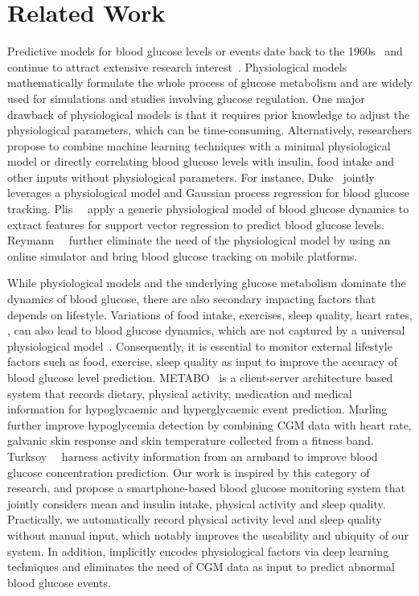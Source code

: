 \section{Related Work}
\label{sec:relwork}
Predictive models for blood glucose levels or events date back to the 1960s~\cite{bib:RBE09:Cobelli} and continue to attract extensive research interest~\cite{bib:IJNMBE16:Oviedo}.
Physiological models~\cite{bib:TBE07:Dalla, bib:PE04:Hovorka} mathematically formulate the whole process of glucose metabolism and are widely used for simulations and studies involving glucose regulation.
One major drawback of physiological models is that it requires prior knowledge to adjust the physiological parameters, which can be time-consuming.
Alternatively, researchers propose to combine machine learning techniques with a minimal physiological model or directly correlating blood glucose levels with insulin, food intake and other inputs without physiological parameters.
For instance, Duke~\cite{bib:Thesis10:Duke} jointly leverages a physiological model and Gaussian process regression for blood glucose tracking.
Plis~\etal~\cite{bib:MAIHA14:Plis} apply a generic physiological model of blood glucose dynamics to extract features for support vector regression to predict blood glucose levels.
Reymann~\etal~\cite{bib:EMBC16:Reymann} further eliminate the need of the physiological model by using an online simulator and bring blood glucose tracking on mobile platforms.

While physiological models and the underlying glucose metabolism dominate the dynamics of blood glucose, there are also secondary impacting factors that depends on lifestyle.
Variations of food intake, exercises, sleep quality, heart rates, \etc, can also lead to blood glucose dynamics, which are not captured by a universal physiological model~\cite{bib:DRCP15:Iwasaki}.
Consequently, it is essential to monitor external lifestyle factors such as food, exercise, sleep quality as input to improve the accuracy of blood glucose level prediction.
METABO~\cite{bib:EMBC09:Georga} is a client-server architecture based system that records dietary, physical activity, medication and medical information for hypoglycaemic and hyperglycaemic event prediction.
Marling~\etal~\cite{bib:KDHealth16:Marling} further improve hypoglycemia detection by combining CGM data with heart rate, galvanic skin response and skin temperature collected from a fitness band. 
Turksoy~\etal~\cite{bib:TBE14:Turksoy} harness activity information from an armband to improve blood glucose concentration prediction.
Our work is inspired by this category of research, and propose a smartphone-based blood glucose monitoring system that jointly considers mean and insulin intake, physical activity and sleep quality.
Practically, we automatically record physical activity level and sleep quality without manual input, which notably improves the useability and ubiquity of our system.  
In addition, \sysname implicitly encodes physiological factors via deep learning techniques and eliminates the need of CGM data as input to predict abnormal blood glucose events.


